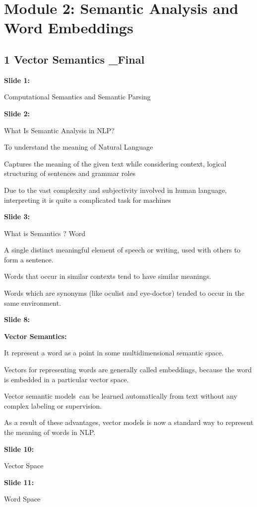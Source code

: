 \documentclass[11pt,a4paper]{article}
\begin{document}
\section{Module 2: Semantic Analysis and Word Embeddings}


\subsection{1 Vector Semantics _Final}

\textbf{Slide 1:}

Computational Semantics and Semantic Parsing

\textbf{Slide 2:}

What Is Semantic Analysis in NLP?

To understand the meaning of Natural Language

Captures the meaning of the given text while considering context, logical structuring of sentences and grammar roles

Due to the vast complexity and subjectivity involved in human language, interpreting it is quite a complicated task for machines

\textbf{Slide 3:}

What is Semantics ? Word

A single distinct meaningful element of speech or writing, used with others to form a sentence.

Words that occur in similar contexts tend to have similar meanings.

Words which are synonyms (like oculist and eye-doctor) tended to occur in the same environment.

\textbf{Slide 8:}

\textbf{Vector Semantics:} 

It represent a word as a point in some multidimensional semantic space.

Vectors for representing words are generally called embeddings, because the word is embedded in a particular vector space.

Vector semantic models can be learned automatically from text without any complex labeling or supervision.

As a result of these advantages, vector models is now a standard way to represent the meaning of words in NLP.

\textbf{Slide 10:}

Vector Space

\textbf{Slide 11:}

Word Space
\end{document}
